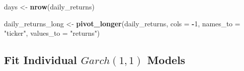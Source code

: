 \documentclass[
]{article}
\newenvironment{Shaded}{\begin{snugshade}}{\end{snugshade}}
\newcommand{\AttributeTok}[1]{\textcolor[rgb]{0.13,0.29,0.53}{#1}}
\newcommand{\DecValTok}[1]{\textcolor[rgb]{0.00,0.00,0.81}{#1}}
\newcommand{\FunctionTok}[1]{\textcolor[rgb]{0.13,0.29,0.53}{\textbf{#1}}}
\newcommand{\NormalTok}[1]{#1}
\newcommand{\OtherTok}[1]{\textcolor[rgb]{0.56,0.35,0.01}{#1}}
\newcommand{\SpecialCharTok}[1]{\textcolor[rgb]{0.81,0.36,0.00}{\textbf{#1}}}
\newcommand{\StringTok}[1]{\textcolor[rgb]{0.31,0.60,0.02}{#1}}
\begin{document}
\begin{Shaded}
\begin{Highlighting}[]
\NormalTok{days }\OtherTok{\textless{}{-}} \FunctionTok{nrow}\NormalTok{(daily\_returns)}

\NormalTok{daily\_returns\_long }\OtherTok{\textless{}{-}} \FunctionTok{pivot\_longer}\NormalTok{(daily\_returns, }\AttributeTok{cols =} \SpecialCharTok{{-}}\DecValTok{1}\NormalTok{, }\AttributeTok{names\_to =} \StringTok{"ticker"}\NormalTok{, }\AttributeTok{values\_to =} \StringTok{"returns"}\NormalTok{)}
\end{Highlighting}
\end{Shaded}

\hypertarget{fit-individual-garch1-1-models}{%
\subsection{\texorpdfstring{Fit Individual \(Garch(1, 1)\)
Models}{Fit Individual Garch(1, 1) Models}}\label{fit-individual-garch1-1-models}}

\begin{Shaded}
\end{Shaded}
\end{document}
